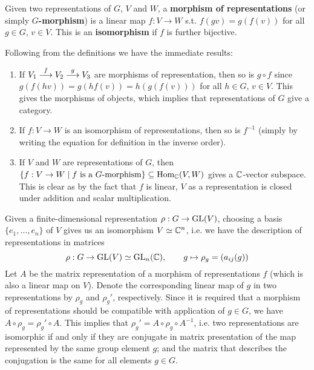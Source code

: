 \begin{definition}
    Given two representations of $G$, $V$ and $W$, a \textbf{morphism of representations} (or simply \textbf{$G$-morphism}) is a linear map $f: V \to W$ s.t. $f(gv) = g(f(v))$ for all $g \in G$, $v \in V$. This is an \textbf{isomorphism} if $f$ is further bijective.  
\end{definition}

\begin{remark}
    Following from the definitions we have the immediate results:
    \begin{enumerate}[label=\arabic*)]
        \item If $V_1 \overset{f}{\longrightarrow} V_2 \overset{g}{\longrightarrow} V_3$ are morphisms of representation, then so is $g \circ f$ since $g(f(hv)) = g(hf(v)) = h(g(f(v)))$ for all $h \in G$, $v \in V$. This gives the morphisms of objects, which implies that representations of $G$ give a category.
        \item If $f: V \to W$ is an isomorphism of representations, then so is $f^{-1}$ (simply by writing the equation for definition in the inverse order).
        \item If $V$ and $W$ are representations of $G$, then $\{ f : V \to W \mid f \text{ is a $G$-morphism} \} \subseteq \mathrm{Hom}_{\mathbb{C}}(V, W)$ gives a $\mathbb{C}$-vector subspace. This is clear as by the fact that $f$ is linear, $V$ as a representation is closed under addition and scalar multiplication.
    \end{enumerate}
\end{remark}

\begin{remark}\label{rmk: repr isom iff conjugate}
    Given a finite-dimensional representation $\rho: G \to \mathrm{GL}(V)$, choosing a basis $\{e_1, \dots, e_n\}$ of $V$ gives us an isomorphism $V \simeq \mathbb{C}^n$, i.e. we have the description of representations in matrices
    \[
        \rho: G \to \mathrm{GL}(V) \simeq \mathrm{GL}_n(\mathbb{C}), \qquad g \mapsto \rho_g = (a_{ij}(g))
    \]
    Let $A$ be the matrix representation of a morphism of representations $f$ (which is also a linear map on $V$). Denote the corresponding linear map of $g$ in two representations by $\rho_g$ and $\rho_g'$, respectively. Since it is required that a morphism of representations should be compatible with application of $g \in G$, we have $A \circ \rho_g = \rho_g' \circ A$. This implies that $\rho_g' = A \circ \rho_g \circ A^{-1}$, i.e. two representations are isomorphic if and only if they are conjugate in matrix presentation of the map represented by the same group element $g$; and the matrix that describes the conjugation is the same for all elements $g \in G$.
\end{remark}

